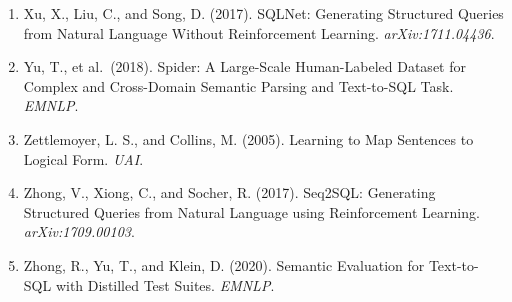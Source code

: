 \documentclass[
  10pt,
]{article}
\begin{document}
\begin{enumerate}
  for Semantic Parsing with Lambda Calculus. \emph{ACL}.
\item
  Xu, X., Liu, C., and Song, D. (2017). SQLNet: Generating Structured
  Queries from Natural Language Without Reinforcement Learning.
  \emph{arXiv:1711.04436}.
\item
  Yu, T., et al.~(2018). Spider: A Large-Scale Human-Labeled Dataset for
  Complex and Cross-Domain Semantic Parsing and Text-to-SQL Task.
  \emph{EMNLP}.
\item
  Zettlemoyer, L. S., and Collins, M. (2005). Learning to Map Sentences
  to Logical Form. \emph{UAI}.
\item
  Zhong, V., Xiong, C., and Socher, R. (2017). Seq2SQL: Generating
  Structured Queries from Natural Language using Reinforcement Learning.
  \emph{arXiv:1709.00103}.
\item
  Zhong, R., Yu, T., and Klein, D. (2020). Semantic Evaluation for
  Text-to-SQL with Distilled Test Suites. \emph{EMNLP}.
\end{enumerate}
\end{document}
